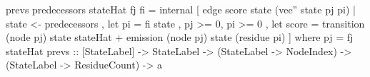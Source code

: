        prevs predecessors stateHat fj fi =
        internal [ edge score state (vee'' state pj pi)
                 | state <- predecessors
                 , let pi = fi state
                 , pj >= 0, pi >= 0
                 , let score = transition (node pj) state stateHat
                               + emission (node pj) state (residue pi)
                 ]
        where pj = fj stateHat
prevs :: [StateLabel] -> StateLabel
      -> (StateLabel -> NodeIndex) -> (StateLabel -> ResidueCount) -> a
